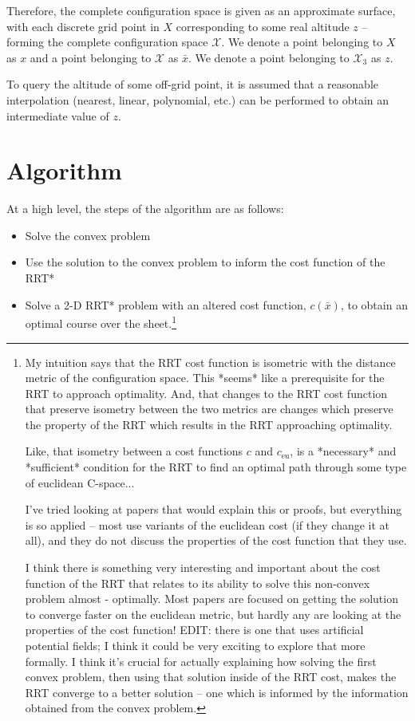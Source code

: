 \documentclass[letterpaper, 12pt]{article}
\begin{document}
Therefore, the complete configuration space is given as an approximate surface, with each discrete grid point in $X$ corresponding to some real altitude $z$ -- forming the complete configuration space $\mathcal{X}$. We denote a point belonging to $X$ as $x$ and a point belonging to $\mathcal{X}$ as $\bar{x}$. We denote a point belonging to $\mathcal{X}_3$ as $z$.

To query the altitude of some off-grid point, it is assumed that a reasonable interpolation (nearest, linear, polynomial, etc.) can be performed to obtain an intermediate value of $z$.

\section{Algorithm}

At a high level, the steps of the algorithm are as follows:

\begin{itemize}
    \item Solve the convex problem
    \item Use the solution to the convex problem to inform the cost function of the RRT*
    \item Solve a 2-D RRT* problem with an altered cost function, $c(\bar{x})$, to obtain an optimal course over the sheet.\footnote{
My intuition says that the RRT cost function is isometric with the distance metric of the configuration space. This *seems* like a prerequisite for the RRT to approach optimality. And, that changes to the RRT cost function that preserve isometry between the two metrics are changes which preserve the property of the RRT which results in the RRT approaching optimality.

Like, that isometry between a cost functions $c$ and $c_\text{eu}$, is a *necessary* and *sufficient* condition for the RRT to find an optimal path through some type of euclidean C-space...

I've tried looking at papers that would explain this or proofs, but everything is so applied -- most use variants of the euclidean cost (if they change it at all), and they do not discuss the properties of the cost function that they use.

I think there is something very interesting and important about the cost function of the RRT that relates to its ability to solve this non-convex problem almost - optimally. Most papers are focused on getting the solution to converge faster on the euclidean metric, but hardly any are looking at the properties of the cost function! EDIT: there is one that uses artificial potential fields; \cite{} I think it could be very exciting to explore that more formally. I think it's crucial for actually explaining how solving the first convex problem, then using that solution inside of the RRT cost, makes the RRT converge to a better solution -- one which is informed by the information obtained from the convex problem.}
\end{itemize}
\end{document}

